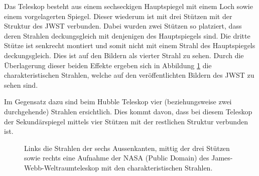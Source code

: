 Das Teleskop besteht aus einem sechseckigen Hauptspiegel mit einem Loch sowie einem vorgelagerten Spiegel.
Dieser wiederum ist mit drei Stützen mit der Struktur des JWST verbunden.
Dabei wurden zwei Stützen so platziert, dass deren Strahlen deckungsgleich mit denjenigen des Hauptspiegels sind.
Die dritte Stütze ist senkrecht montiert und somit nicht mit einem Strahl des Hauptspiegels deckungsgleich.
Dies ist auf den Bildern als vierter Strahl zu sehen.
Durch die Überlagerung dieser beiden Effekte ergeben sich in Abbildung \ref{opt:fig:jwst} die charakteristischen Strahlen, welche auf
den veröffentlichten Bildern des JWST zu sehen sind.

Im Gegensatz dazu sind beim Hubble Teleskop vier (beziehungsweise zwei durchgehende) Strahlen ersichtlich.
Dies kommt davon, dass bei diesem Teleskop der Sekundärspiegel mittels vier Stützen mit der restlichen Struktur verbunden ist.

\begin{figure}
    \centering

    \hfill
    \hfill
    \caption{Links die Strahlen der sechs Aussenkanten, mittig der drei Stützen sowie rechts eine Aufnahme der NASA (Public Domain)
        des James-Webb-Weltraumteleskop mit den charakteristischen Strahlen.}
    \label{opt:fig:jwst}
\end{figure}
